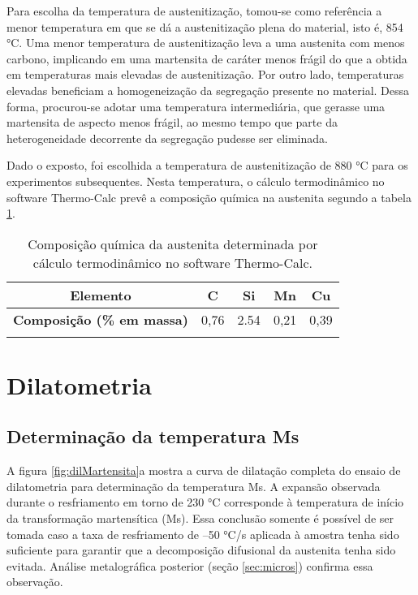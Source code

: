 Para escolha da temperatura de austenitização, tomou-se como referência a menor temperatura em que se dá a austenitização plena do material, isto é, 854 °C. Uma menor temperatura de austenitização leva a uma austenita com menos carbono, implicando em uma martensita de caráter menos frágil do que a obtida em temperaturas mais elevadas de austenitização. Por outro lado, temperaturas elevadas beneficiam a homogeneização da segregação presente no material. Dessa forma, procurou-se adotar uma temperatura intermediária, que gerasse uma martensita de aspecto menos frágil, ao mesmo tempo que parte da heterogeneidade decorrente da segregação pudesse ser eliminada.

Dado o exposto, foi escolhida a temperatura de austenitização de 880 °C para os experimentos subsequentes. Nesta temperatura, o cálculo termodinâmico no software Thermo-Calc\textregistered{} prevê a composição química na austenita segundo a tabela \ref{tab:CQaust}.

\begin{table}
	\caption{Composição química da austenita determinada por cálculo termodinâmico no software Thermo-Calc\textregistered{}.}
	\begin{tabular}{c c c c c}
	\thickhline
	\textbf{Elemento} & C & Si & Mn & Cu\\
	\hline
	\textbf{Composição (\% em massa)} & 0,76 & 2.54 & 0,21 & 0,39\\
	\thickhline
	\end{tabular}
	\label{tab:CQaust}
\end{table}

\section{Dilatometria}

\subsection{Determina\c{c}\~{a}o da temperatura Ms}

A figura \ref{fig:dilMartensita}a mostra a curva de dilatação completa do ensaio de dilatometria para determinação da temperatura Ms. A expansão observada durante o resfriamento em torno de 230 °C corresponde à temperatura de início da transformação martensítica (Ms). Essa conclusão somente é possível de ser tomada caso a taxa de resfriamento de --50 °C/s aplicada à amostra tenha sido suficiente para garantir que a decomposição difusional da austenita tenha sido evitada. Análise metalográfica posterior (seção \ref{sec:micros}) confirma essa observação.

